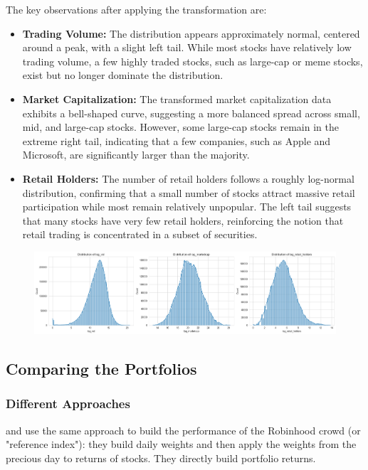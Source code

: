 The key observations after applying the transformation are:
\begin{itemize}
    \item \textbf{Trading Volume:} The distribution appears approximately normal, centered around a peak, with a slight left tail. While most stocks have relatively low trading volume, a few highly traded stocks, such as large-cap or meme stocks, exist but no longer dominate the distribution.
    \item \textbf{Market Capitalization:} The transformed market capitalization data exhibits a bell-shaped curve, suggesting a more balanced spread across small, mid, and large-cap stocks. However, some large-cap stocks remain in the extreme right tail, indicating that a few companies, such as Apple and Microsoft, are significantly larger than the majority.
    
    \item \textbf{Retail Holders:} The number of retail holders follows a roughly log-normal distribution, confirming that a small number of stocks attract massive retail participation while most remain relatively unpopular. The left tail suggests that many stocks have very few retail holders, reinforcing the notion that retail trading is concentrated in a subset of securities.
\end{itemize}

\begin{figure}[h!]
    \centering
    \includegraphics[width=1\linewidth]{../images/Distributions.png}
\end{figure}





\subsection{Comparing the Portfolios}
\subsubsection{Different Approaches} 
\cite{Fedyk2024} and \cite{Welch2022} use the same approach to build the performance of the Robinhood crowd (or "reference index"): 
they build daily weights and then apply the weights from the precious day to returns of stocks. They directly build portfolio returns.

